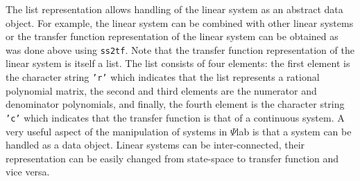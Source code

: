 	The list representation allows handling of the linear system as an
abstract data object.  For example, the linear system can be combined
with other linear systems or the transfer function representation of
the linear system can be obtained as was done above using {\tt ss2tf}.
Note that the transfer function representation of the linear system
is itself a list. The list consists of four elements: the first element 
is the character string {\tt 'r'} which indicates
that the list represents a rational polynomial matrix, the 
second and third elements are the numerator and
denominator polynomials, and finally, the fourth element is the character
string {\tt 'c'} which indicates that the transfer function is that of
a continuous system.
	A very useful aspect of
the manipulation of systems in $\Psi$lab  is that a system can
be handled as a data object.
Linear systems can be 
inter-connected,
their representation
can be easily changed from state-space to transfer function
and vice versa.

